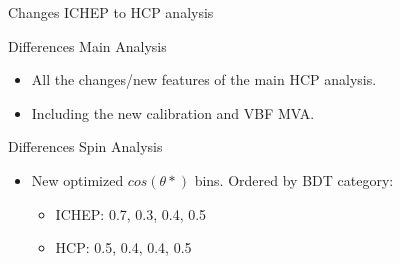 \documentclass[8pt]{beamer}
\begin{document}
\begin{frame}{Changes ICHEP to HCP analysis}
 
   \begin{block}{Differences Main Analysis}
   
    \begin{itemize}
      \item All the changes/new features of the main HCP analysis.
      \item Including the new calibration and VBF MVA.
    \end{itemize}
   
  \end{block}

     \begin{block}{Differences Spin Analysis}
   
    \begin{itemize}
      \item New optimized $cos(\theta *)$ bins. Ordered by BDT category:
      \begin{itemize}
        \item ICHEP: 0.7, 0.3, 0.4, 0.5
        \item HCP: 0.5, 0.4, 0.4, 0.5
      \end{itemize}
    \end{itemize}
   
  \end{block}
  
\end{frame}
\end{document}
